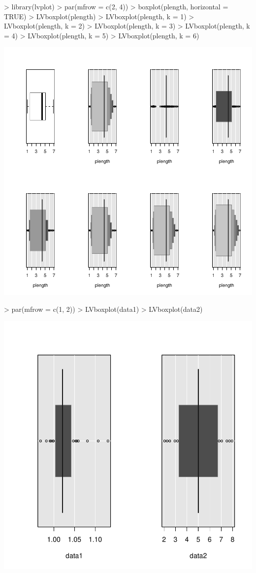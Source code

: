 \begin{Schunk}
\begin{Sinput}
> library(lvplot)
> par(mfrow = c(2, 4))
> boxplot(plength, horizontal = TRUE)
> LVboxplot(plength)
> LVboxplot(plength, k = 1)
> LVboxplot(plength, k = 2)
> LVboxplot(plength, k = 3)
> LVboxplot(plength, k = 4)
> LVboxplot(plength, k = 5)
> LVboxplot(plength, k = 6)
\end{Sinput}
\end{Schunk}
\includegraphics{lect_chapter5_v2-014}


\begin{Schunk}
\begin{Sinput}
> par(mfrow = c(1, 2))
> LVboxplot(data1)
> LVboxplot(data2)
\end{Sinput}
\end{Schunk}
\includegraphics{lect_chapter5_v2-015}


